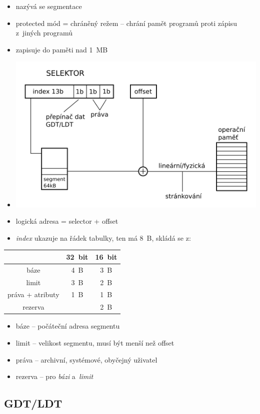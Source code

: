 \documentclass[a4paper,12pt]{article}
\providecommand{\tightlist}{%
\setlength{\itemsep}{0pt}\setlength{\parskip}{0pt}}
\begin{document}
\begin{itemize}
\tightlist
\item nazývá se segmentace
\item protected mód = chráněný režem -- chrání pamět programů proti zápisu
z~jiných programů
\item zapisuje do paměti nad 1~MB
\item[] \includegraphics[width=13.651cm]{ref/vypocet-logicke-adresy.png}
\item logická adresa = selector + offset
\item \emph{index} ukazuje na řádek tabulky, ten má 8~B, skládá se z:
\end{itemize}

\begin{tabular}{|c|c|c|}
\hline
& 32~bit & 16~bit \\ \hline
báze & 4~B & 3~B \\ \hline
limit & 3~B & 2~B \\ \hline
práva + atributy & 1~B & 1~B \\ \hline
rezerva & & 2~B \\ \hline
\end{tabular}

\begin{itemize}
\tightlist
\item báze -- počáteční adresa segmentu
\item limit -- velikost segmentu, musí být menší než offset
\item práva -- archivní, systémové, obyčejný uživatel
\item rezerva -- pro \emph{bázi} a~\emph{limit}
\end{itemize}

\subsection{GDT/LDT}
\end{document}
